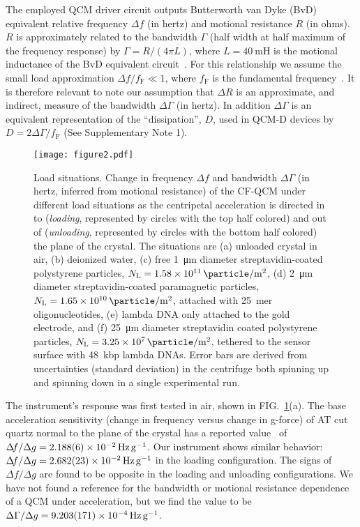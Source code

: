 \documentclass[floatfix,superscriptaddress,a4paper,twocolumn]{revtex4-1}
\newcommand{\Figure}[1]{FIG.~\ref{#1}}
\newcommand{\df}{\Delta\!f}
\newcommand{\dg}{\Delta\Gamma}
\begin{document}
The employed QCM driver circuit outputs Butterworth van Dyke (BvD)
equivalent relative frequency $\df$ (in hertz) and motional resistance $R$ (in ohms).
$R$ is approximately related to the bandwidth $\Gamma$ (half width at half
maximum of the frequency response) by $\Gamma=R/\left(4\pi L\right)$, where
$L=\SI{40}{\milli\henry}$ is the motional inductance of the BvD
equivalent circuit~\cite{arnau2002circuit}.  For this
relationship we assume the small load approximation $\df/f_\mathrm{F} \ll
1$, where $f_\mathrm{F}$ is the fundamental frequency~\cite{geelhood2002transient}.
It is therefore relevant to note our assumption that $\Delta R$ is an
approximate, and indirect, measure of the bandwidth $\dg$ (in
hertz).  In addition $\dg$ is an equivalent representation of the ``dissipation'', $D$, used in
QCM-D devices by $D=2\dg/f_\mathrm{F}$ (See Supplementary Note 1).
\begin{figure*}[ht]
\centering
\texttt{[image: figure2.pdf]}
\caption{Load situations.
Change in frequency $\df$ and bandwidth $\dg$
(in hertz, inferred from motional resistance) of
the CF-QCM under different load situations as the centripetal acceleration
is directed in to (\textit{loading}, represented by circles with the top half
colored) and out of (\textit{unloading}, represented by circles with the
bottom half colored) the plane of the crystal.
The situations are
(a) unloaded crystal in air,
(b) deionized water,
(c) free \SI{1}{\micro\meter} diameter streptavidin-coated polystyrene
particles, $N_\mathrm{L}=\SI{1.58e11}{\particle\per\meter\squared}$,
(d) \SI{2}{\micro\meter} diameter streptavidin-coated paramagnetic
particles, $N_\mathrm{L}=\SI{1.65e10}{\particle\per\meter\squared}$,
attached with \SI{25}{mer} oligonucleotides,
(e) lambda DNA only attached to the gold electrode, and
(f) \SI{25}{\micro\meter} diameter streptavidin
coated polystyrene particles,
$N_\mathrm{L}=\SI{3.25e7}{\particle\per\meter\squared}$, tethered to the sensor surface with
\SI{48}{kbp} lambda DNAs.  Error bars are derived from uncertainties
(standard deviation) in
the centrifuge both spinning up and spinning down in a single experimental
run.
}
\label{fig:loadplot}
\end{figure*}

The instrument's response was first tested in air, shown in
\Figure{fig:loadplot}(a).  The base acceleration sensitivity (change in
frequency versus change in g-force) of AT cut quartz normal to the plane of
the crystal has a reported value~\cite{valdois2794influence} of $\df/\Delta
g =\SI{2.188+-0.006e-2}{\hertz\per\g}$.  Our instrument shows similar behavior:
$\df/\Delta g =\SI{2.682+-0.023e-2}{\hertz\per\g}$ in the loading
configuration.  The signs of $\df/\Delta g$ are found to be opposite in the loading
and unloading configurations.  We have not found a reference for the
bandwidth or motional resistance dependence of a QCM under acceleration,
but we find the value to be $\dg/\Delta g = \SI{9.203+-0.171e-4}{\hertz\per\g}$.
\end{document}
